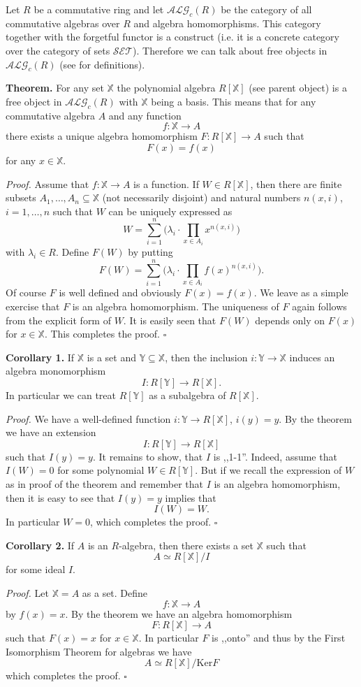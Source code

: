 \documentclass[12pt]{article}
\newcommand{\alg}{\mathcal{ALG}_{c}(R)}
\newcommand{\X}{\mathbb{X}}
\newcommand{\Y}{\mathbb{Y}}
\begin{document}
Let $R$ be a commutative ring and let $\alg$ be the category of all commutative algebras over $R$ and algebra homomorphisms. This category together with the forgetful functor is a construct (i.e. it is a concrete category over the category of sets $\mathcal{SET}$). Therefore we can talk about free objects in $\alg$ (see  for definitions).

\textbf{Theorem.} For any set $\X$ the polynomial algebra $R[\X]$ (see parent object) is a free object in $\alg$ with $\X$ being a basis. This means that for any commutative algebra $A$ and any function
$$f:\X\to A$$
there exists a unique algebra homomorphism $F:R[\X]\to A$ such that
$$F(x)=f(x)$$
for any $x\in \X$.

\textit{Proof.} Assume that $f:\X\to A$ is a function. If $W\in R[\X]$, then there are finite subsets $A_1,\ldots,A_n\subseteq \X$ (not necessarily disjoint) and natural numbers $n(x,i)$, $i=1,\ldots,n$ such that $W$ can be uniquely expressed as
$$W=\sum_{i=1}^n \bigg(\lambda_i\cdot\prod_{x\in A_i}x^{n(x,i)}\bigg)$$
with $\lambda_i\in R$. Define $F(W)$ by putting
$$F(W)=\sum_{i=1}^n \bigg(\lambda_i\cdot\prod_{x\in A_i}f(x)^{n(x,i)}\bigg).$$
Of course $F$ is well defined and obviously $F(x)=f(x)$. We leave as a simple exercise that $F$ is an algebra homomorphism.
The uniqueness of $F$ again follows from the explicit form of $W$. It is easily seen that $F(W)$ depends only on $F(x)$ for $x\in\X$. This completes the proof. $\square$

\textbf{Corollary 1.} If $\X$ is a set and $\Y\subseteq\X$, then the inclusion $i:\Y\to\X$ induces an algebra monomorphism
$$I:R[\Y]\to R[\X].$$
In particular we can treat $R[\Y]$ as a subalgebra of $R[\X]$.

\textit{Proof.} We have a well-defined function $i:\Y\to R[\X]$, $i(y)=y$. By the theorem we have an extension
$$I:R[\Y]\to R[\X]$$
such that $I(y)=y$. It remains to show, that $I$ is ,,1-1''. Indeed, assume that $I(W)=0$ for some polynomial $W\in R[\Y]$. But if we recall the expression of $W$ as in proof of the theorem and remember that $I$ is an algebra homomorphism, then it is easy to see that $I(y)=y$ implies that
$$I(W)=W.$$
In particular $W=0$, which completes the proof. $\square$

\textbf{Corollary 2.} If $A$ is an $R$-algebra, then there exists a set $\X$ such that
$$A\simeq R[\X]/I$$
for some ideal $I$.

\textit{Proof.} Let $\X=A$ as a set. Define
$$f:\X\to A$$
by $f(x)=x$. By the theorem we have an algebra homomorphism
$$F:R[\X]\to A$$
such that $F(x)=x$ for $x\in \X$. In particular $F$ is ,,onto'' and thus by the First Isomorphism Theorem for algebras we have
$$A\simeq R[\X]/\mathrm{Ker}F$$
which completes the proof. $\square$
\end{document}
